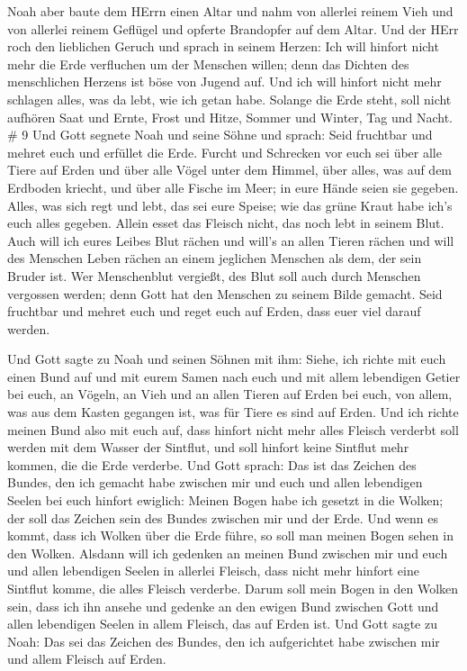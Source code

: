  Noah aber baute dem HErrn einen Altar und nahm von
allerlei reinem Vieh und von allerlei reinem Geflügel und opferte
Brandopfer auf dem Altar.  Und der HErr roch den lieblichen
Geruch und sprach in seinem Herzen: Ich will hinfort nicht mehr die Erde
verfluchen um der Menschen willen; denn das Dichten des menschlichen
Herzens ist böse von Jugend auf. Und ich will hinfort nicht mehr
schlagen alles, was da lebt, wie ich getan habe.  Solange
die Erde steht, soll nicht aufhören Saat und Ernte, Frost und Hitze,
Sommer und Winter, Tag und Nacht. \# 9  Und Gott segnete
Noah und seine Söhne und sprach: Seid fruchtbar und mehret euch und
erfüllet die Erde.  Furcht und Schrecken vor euch sei über
alle Tiere auf Erden und über alle Vögel unter dem Himmel, über alles,
was auf dem Erdboden kriecht, und über alle Fische im Meer; in eure
Hände seien sie gegeben.  Alles, was sich regt und lebt, das
sei eure Speise; wie das grüne Kraut habe ich's euch alles gegeben.
 Allein esset das Fleisch nicht, das noch lebt in seinem
Blut.  Auch will ich eures Leibes Blut rächen und will's an
allen Tieren rächen und will des Menschen Leben rächen an einem
jeglichen Menschen als dem, der sein Bruder ist.  Wer
Menschenblut vergießt, des Blut soll auch durch Menschen vergossen
werden; denn Gott hat den Menschen zu seinem Bilde gemacht. 
Seid fruchtbar und mehret euch und reget euch auf Erden, dass euer viel
darauf werden.

 Und Gott sagte zu Noah und seinen Söhnen mit ihm:
 Siehe, ich richte mit euch einen Bund auf und mit eurem
Samen nach euch  und mit allem lebendigen Getier bei euch,
an Vögeln, an Vieh und an allen Tieren auf Erden bei euch, von allem,
was aus dem Kasten gegangen ist, was für Tiere es sind auf Erden.
 Und ich richte meinen Bund also mit euch auf, dass hinfort
nicht mehr alles Fleisch verderbt soll werden mit dem Wasser der
Sintflut, und soll hinfort keine Sintflut mehr kommen, die die Erde
verderbe.  Und Gott sprach: Das ist das Zeichen des Bundes,
den ich gemacht habe zwischen mir und euch und allen lebendigen Seelen
bei euch hinfort ewiglich:  Meinen Bogen habe ich gesetzt
in die Wolken; der soll das Zeichen sein des Bundes zwischen mir und der
Erde.  Und wenn es kommt, dass ich Wolken über die Erde
führe, so soll man meinen Bogen sehen in den Wolken. 
Alsdann will ich gedenken an meinen Bund zwischen mir und euch und allen
lebendigen Seelen in allerlei Fleisch, dass nicht mehr hinfort eine
Sintflut komme, die alles Fleisch verderbe.  Darum soll
mein Bogen in den Wolken sein, dass ich ihn ansehe und gedenke an den
ewigen Bund zwischen Gott und allen lebendigen Seelen in allem Fleisch,
das auf Erden ist.  Und Gott sagte zu Noah: Das sei das
Zeichen des Bundes, den ich aufgerichtet habe zwischen mir und allem
Fleisch auf Erden.

